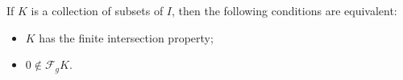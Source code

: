If $K$ is a collection of subsets of $I$, then the following conditions are equivalent:
\begin{itemize}
\item[(i)] $K$ has the finite intersection property;
\item[(ii)] $0 \notin \mathcal{F}_g K$.
\end{itemize}
